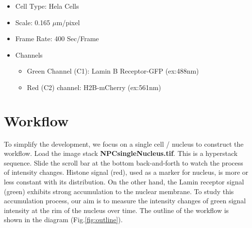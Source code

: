 \begin{itemize}
\item Cell Type: Hela Cells
\item Scale: 0.165 $\mu$m/pixel
\item Frame Rate: 400 Sec/Frame
\item Channels
\begin{itemize}
	\item Green Channel (C1): Lamin B Receptor-GFP (ex:488nm)
    \item Red (C2) channel: H2B-mCherry (ex:561nm) 
\end{itemize}
\end{itemize}

\section{Workflow}





To simplify the development, we focus on a single cell / nucleus to construct the workflow. Load the image stack \textbf{NPCsingleNucleus.tif}. This is a hyperstack sequence. Slide the scroll bar at the bottom back-and-forth to watch the process of intensity changes. Histone signal (red), used as a marker for nucleus, is more or less constant with its distribution. On the other hand, the Lamin receptor signal (green) exhibits strong accumulation to the nuclear membrane. To study this accumulation process, our aim is to measure the intensity changes of green signal intensity at the rim of the nucleus over time. The outline of the workflow is shown in the diagram (Fig.\ref{fig:outline}). 

